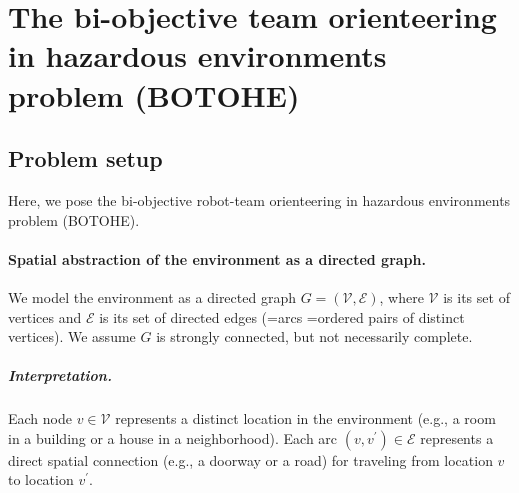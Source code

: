 \documentclass[11pt, oneside]{article}
\begin{document}
\section{The bi-objective team orienteering in hazardous environments problem (BOTOHE)}




\subsection{Problem setup}
Here, we pose the bi-objective robot-team orienteering in hazardous environments problem (BOTOHE).

\paragraph{Spatial abstraction of the environment as a directed graph.}
We model the environment as a directed graph $G=(\mathcal{V}, \mathcal{E})$, where $\mathcal{V}$ is its set of vertices and $\mathcal{E}$ is its set of directed edges (=arcs =ordered pairs of distinct vertices). We assume $G$ is strongly connected, but not necessarily complete.

\vspace{-\baselineskip}
\subparagraph{Interpretation.} 
Each node $v\in \mathcal{V}$ represents a distinct location in the environment (e.g., a room in a building or a house in a neighborhood).
Each arc $(v, v^\prime) \in \mathcal{E}$ represents a direct spatial connection (e.g., a doorway or a road) for traveling from location $v$ to location $v^\prime$.


\end{document}
